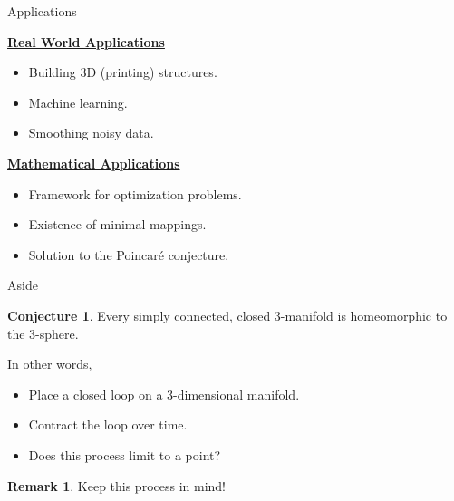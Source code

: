 \documentclass[usenames,dvipsnames]{beamer}
\theoremstyle{definition}
\newtheorem*{remark}{Remark}
\newtheorem*{conjecture}{Conjecture}
\theoremstyle{theorem}
\begin{document}
        \begin{frame}{Applications}
            \begin{center}
                \textbf{\underline{Real World Applications}}
            \end{center}
            \begin{itemize}
                \item Building 3D (printing) structures.
                \item Machine learning.
                \item Smoothing noisy data.
            \end{itemize}
            \begin{center}
                \vspace*{.5cm}
                \pause
                \textbf{\underline{Mathematical Applications}}
            \end{center}
            \begin{itemize}
                \item Framework for optimization problems.
                \item Existence of minimal mappings.
                \item Solution to the Poincar\'e conjecture.
            \end{itemize}
        \end{frame}
        
        \begin{frame}{Aside}
            \begin{conjecture}
                Every simply connected, closed 3-manifold is homeomorphic to the 3-sphere.
            \end{conjecture}
            \pause
            In other words,
            \begin{itemize}
                \item Place a closed loop on a 3-dimensional manifold.
                \pause
                \item Contract the loop over time.
                \pause
                \item Does this process limit to a point?
            \end{itemize}
            \pause
            \begin{remark}
            Keep this process in mind!
            \end{remark}
        \end{frame}
        
\end{document}

